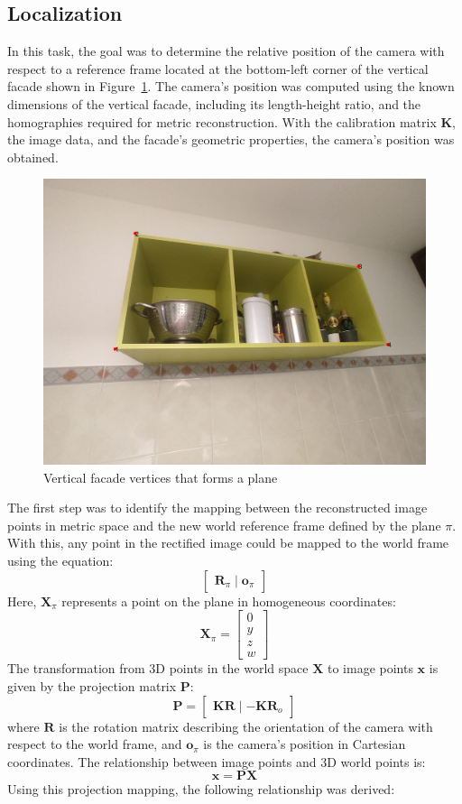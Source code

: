 \documentclass{Academic}
\begin{document}
\subsection{Localization}
In this task, the goal was to determine the relative position of the camera with respect to a reference frame located at the bottom-left corner of the vertical facade shown in Figure~\ref{fig:world}.
\noindent  The camera's position was computed using the known dimensions of the vertical facade, including its length-height ratio, and the homographies required for metric reconstruction. 
With the calibration matrix $\mathbf{K}$, the image data, and the facade's geometric properties, the camera's position was obtained.
\begin{figure}[!htb]
    \centering
    \includegraphics[width=0.5\linewidth]{images/world.png}
    \caption{Vertical facade vertices that forms a plane}
    \label{fig:world}
\end{figure}
The first step was to identify the mapping between the reconstructed image points in metric space and the new world reference frame defined by the plane $\pi$. 
With this, any point in the rectified image could be mapped to the world frame using the equation:
\begin{equation}
\begin{bmatrix}
    \mathbf{R}_\pi \mid \mathbf{o}_\pi 
\end{bmatrix}
\end{equation}
Here, $\mathbf{X}_\pi$ represents a point on the plane in homogeneous coordinates:
\begin{equation}\mathbf{X}_\pi = \begin{bmatrix} 
0 \\ y \\ z \\ w
\end{bmatrix} \end{equation}
The transformation from 3D points in the world space $\mathbf{X}$ to image points $\mathbf{x}$ is given by the projection matrix $\mathbf{P}$:
\begin{equation} 
\mathbf{P} = \begin{bmatrix}
    \mathbf{KR} \mid -\mathbf{KR}_o 
\end{bmatrix}
\end{equation}
where $\mathbf{R}$ is the rotation matrix describing the orientation of the camera with respect to the world frame, and $\mathbf{o}_\pi$ is the camera's position in Cartesian coordinates.
The relationship between image points and 3D world points is:
\begin{equation}\mathbf{x}=\mathbf{PX}\end{equation}
Using this projection mapping, the following relationship was derived:
\end{document}
